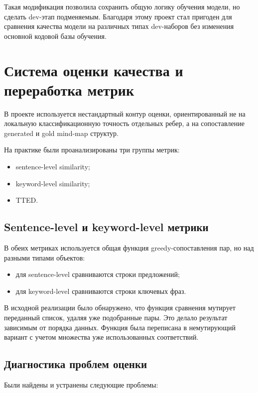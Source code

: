 \documentclass[12pt,a4paper]{article}
\begin{document}
Такая модификация позволила сохранить общую логику обучения модели, но сделать dev-этап
подменяемым. Благодаря этому проект стал пригоден для сравнения качества модели на
различных типах dev-наборов без изменения основной кодовой базы обучения.

\section{Система оценки качества и переработка метрик}

В проекте используется нестандартный контур оценки, ориентированный не на локальную
классификационную точность отдельных ребер, а на сопоставление generated и gold mind-map
структур.

На практике были проанализированы три группы метрик:

\begin{itemize}
    \item sentence-level similarity;
    \item keyword-level similarity;
    \item TTED.
\end{itemize}

\subsection{Sentence-level и keyword-level метрики}

В обеих метриках используется общая функция greedy-сопоставления пар, но над разными
типами объектов:

\begin{itemize}
    \item для sentence-level сравниваются строки предложений;
    \item для keyword-level сравниваются строки ключевых фраз.
\end{itemize}

В исходной реализации было обнаружено, что функция сравнения мутирует переданный список,
удаляя уже подобранные пары. Это делало результат зависимым от порядка данных. Функция
была переписана в немутирующий вариант с учетом множества уже использованных
соответствий.

\subsection{Диагностика проблем оценки}

Были найдены и устранены следующие проблемы:
\end{document}

